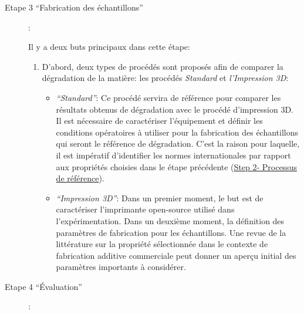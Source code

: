 \begin{description}
\begin{itemize}[noitemsep]
	\end{itemize}
	
	\item[ \hypertarget{Step3}{Etape 3 ``Fabrication des échantillons''}]: 
	
	Il y a deux buts principaux dans cette étape:
	
	\begin{enumerate}
		\item D'abord, deux types de procédés sont proposés afin de comparer la dégradation de la matière:
		les procédés \textit{Standard} et \textit{l'Impression 3D}: 
		
		\begin{itemize}[noitemsep]
			
			\item 	 \textit{``Standard''}: Ce procédé servira de référence pour comparer les résultats obtenus de dégradation avec le procédé d'impression 3D.	
			Il est nécessaire de caractériser l'équipement et définir les conditions opératoires à utiliser pour la fabrication des échantillons qui seront le référence de dégradation. 
			C'est la raison pour laquelle, il est impératif d'identifier les normes internationales par rapport aux propriétés choisies dans le étape précédente (\hyperlink{Step2}{Step 2- Processus de référence}).
			
			
			\item 	\textit{``Impression 3D''}: Dans un premier moment, le but est de caractériser l'imprimante open-source utilisé dans l'expérimentation. 
			Dans un deuxième moment, la définition des paramètres de fabrication pour les échantillons. 
			Une revue de la littérature sur la propriété sélectionnée dans le contexte de fabrication additive commerciale  peut donner un aperçu initial des paramètres importants à considérer.
			
		\end{itemize}
		
	
		
		
	\end{enumerate}
	
	
	
	\item[ \hypertarget{Step4}{Etape 4 ``Évaluation''}]: 
	

\end{description}
